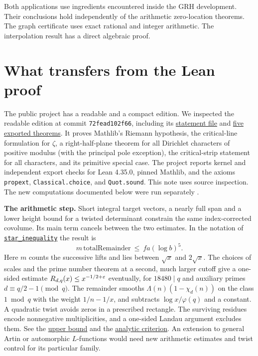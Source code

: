 \documentclass[11pt,letterpaper]{article}
\newcommand{\src}[2]{\href{https://github.com/lsernau/grh-lean/blob/72fead102f663d5c7a407964a13dc0cf9d977207/grh/src/#1}{#2}}
\newcommand{\code}[1]{{\small\texttt{#1}}}
\begin{document}
Both applications use ingredients encountered inside the GRH development. Their conclusions hold independently of the arithmetic zero-location theorems. The graph certificate uses exact rational and integer arithmetic. The interpolation result has a direct algebraic proof.

\newpage
\section{What transfers from the Lean proof}
The public project has a readable and a compact edition. We inspected the readable edition at commit \texttt{72fead102f66}, including its
\src{Statements.lean}{statement file} and \src{Main.lean}{five exported theorems}. It proves Mathlib's Riemann hypothesis, the critical-line formulation for $\zeta$, a right-half-plane theorem for all Dirichlet characters of positive modulus (with the principal pole exception), the critical-strip statement for all characters, and its primitive special case. The project reports kernel and independent export checks for Lean 4.35.0, pinned Mathlib, and the axioms \code{propext}, \code{Classical.choice}, and \code{Quot.sound}. This note uses source inspection. The new computations documented below were run separately \cite{Repo}.

\textbf{The arithmetic step.}
Short integral target vectors, a nearly full span and a lower height bound for a twisted determinant constrain the same index-corrected covolume. Its main term cancels between the two estimates. In the notation of
\src{New/Reduction/MainInequality.lean\#L87}{\code{star\_inequality}} the result is
\[
          m\,\mathrm{totalRemainder}\ \le\ f a (\log b)^5 .
\]
Here $m$ counts the successive lifts and lies between $\sqrt{x}$ and $2\sqrt{x}$. The choices of scales and the prime number theorem at a second, much larger cutoff give a one-sided estimate $R_{d,q}(x)\le x^{-1/2+\varepsilon}$ eventually, for $18480\mid q$ and auxiliary primes $d\equiv q/2-1\pmod q$. The remainder smooths $\Lambda(n)(1-\chi_d(n))$ on the class $1\bmod q$ with the weight $1/n-1/x$, and subtracts $\log x/\varphi(q)$ and a constant. A quadratic twist avoids zeros in a prescribed rectangle. The surviving residues encode nonnegative multiplicities, and a one-sided Landau argument excludes them. See the \src{New/Reduction/OneSidedBound.lean}{upper bound} and the \src{New/Reduction/Zeros/Criterion.lean}{analytic criterion}. An extension to general Artin or automorphic $L$-functions would need new arithmetic estimates and twist control for its particular family.
\end{document}

